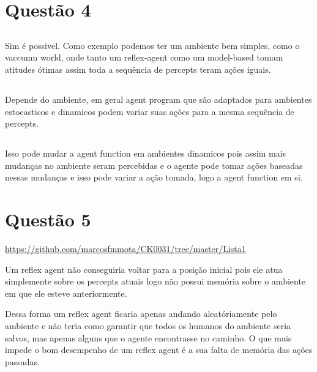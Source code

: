 \documentclass[a4paper,12pt]{article}
\begin{document}
\section{Questão 4}

\subsection{}
Sim é possivel. Como exemplo podemos ter um ambiente bem simples, como o vaccumn world, onde tanto um reflex-agent como um model-based tomam atitudes ótimas assim toda a sequência de percepts teram ações iguais.

\subsection{}
Depende do ambiente, em geral agent program que são adaptados para ambientes estocasticos e dinamicos podem variar suas ações para a mesma sequência de percepts.

\subsection{}
Isso pode mudar a agent function em ambientes dinamicos pois assim mais mudanças no ambiente seram percebidas e o agente pode tomar ações baseadas nessas mudanças e isso pode variar a ação tomada, logo a agent function em si.

\section{Questão 5}

\url{https://github.com/marcosfmmota/CK0031/tree/master/Lista1}

Um reflex agent não conseguiria voltar para a posição inicial pois ele atua simplemente sobre os percepts atuais logo não possui memória sobre o ambiente em que ele esteve anteriormente.

Dessa forma um reflex agent ficaria apenas andando aleatóriamente pelo ambiente e não teria como garantir que todos os humanos do ambiente seria salvos, mas apenas alguns que o agente encontrasse no caminho. O que mais impede o bom desempenho de um reflex agent é a sua falta de memória das ações passadas.
\end{document}
